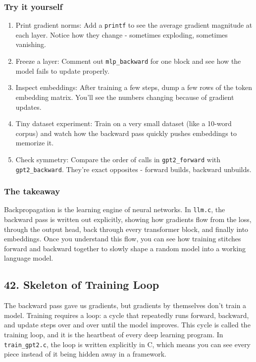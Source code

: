 \documentclass[
  letterpaper,
  DIV=11,
  numbers=noendperiod]{scrreprt}
\providecommand{\tightlist}{%
  \setlength{\itemsep}{0pt}\setlength{\parskip}{0pt}}
\begin{document}
\subsubsection{Try it yourself}\label{try-it-yourself-29}

\begin{enumerate}
\def\labelenumi{\arabic{enumi}.}
\tightlist
\item
  Print gradient norms: Add a \texttt{printf} to see the average
  gradient magnitude at each layer. Notice how they change - sometimes
  exploding, sometimes vanishing.
\item
  Freeze a layer: Comment out \texttt{mlp\_backward} for one block and
  see how the model fails to update properly.
\item
  Inspect embeddings: After training a few steps, dump a few rows of the
  token embedding matrix. You'll see the numbers changing because of
  gradient updates.
\item
  Tiny dataset experiment: Train on a very small dataset (like a 10-word
  corpus) and watch how the backward pass quickly pushes embeddings to
  memorize it.
\item
  Check symmetry: Compare the order of calls in \texttt{gpt2\_forward}
  with \texttt{gpt2\_backward}. They're exact opposites - forward
  builds, backward unbuilds.
\end{enumerate}

\subsubsection{The takeaway}\label{the-takeaway-30}

Backpropagation is the learning engine of neural networks. In
\texttt{llm.c}, the backward pass is written out explicitly, showing how
gradients flow from the loss, through the output head, back through
every transformer block, and finally into embeddings. Once you
understand this flow, you can see how training stitches forward and
backward together to slowly shape a random model into a working language
model.

\subsection{42. Skeleton of Training
Loop}\label{skeleton-of-training-loop}

The backward pass gave us gradients, but gradients by themselves don't
train a model. Training requires a loop: a cycle that repeatedly runs
forward, backward, and update steps over and over until the model
improves. This cycle is called the training loop, and it is the
heartbeat of every deep learning program. In \texttt{train\_gpt2.c}, the
loop is written explicitly in C, which means you can see every piece
instead of it being hidden away in a framework.
\end{document}

